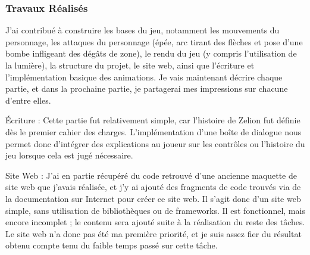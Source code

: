 \documentclass[a4page, 14pt]{extarticle}
\begin{document}
        \subsubsection{Travaux Réalisés}{
    J'ai contribué à construire les bases du jeu, notamment les mouvements du personnage, les attaques du personnage (épée, arc tirant des flèches et pose d'une bombe infligeant des dégâts de zone), le rendu du jeu (y compris l'utilisation de la lumière), la structure du projet, le site web, ainsi que l'écriture et l'implémentation basique des animations. Je vais maintenant décrire chaque partie, et dans la prochaine partie, je partagerai mes impressions sur chacune d'entre elles.

    Écriture : Cette partie fut relativement simple, car l'histoire de Zelion fut définie dès le premier cahier des charges. L'implémentation d'une boîte de dialogue nous permet donc d'intégrer des explications au joueur sur les contrôles ou l'histoire du jeu lorsque cela est jugé nécessaire. 
    
    Site Web : J'ai en partie récupéré du code retrouvé d'une ancienne maquette de site web que j'avais réalisée, et j'y ai ajouté des fragments de code trouvés via de la documentation sur Internet pour créer ce site web. Il s'agit donc d'un site web simple, sans utilisation de bibliothèques ou de frameworks. Il est fonctionnel, mais encore incomplet ; le contenu sera ajouté suite à la réalisation du reste des tâches.
    Le site web n'a donc pas été ma première priorité, et je suis assez fier du résultat obtenu compte tenu du faible temps passé sur cette tâche.  
    
}
\end{document}
